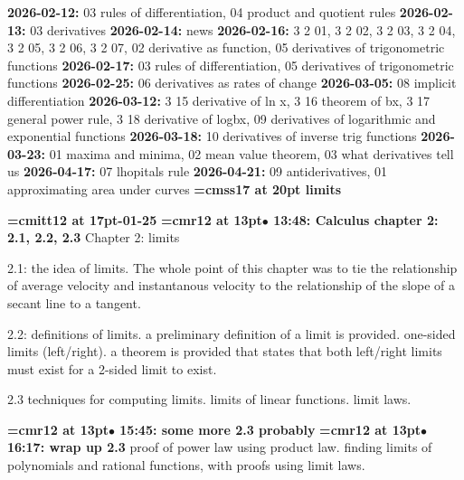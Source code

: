 {\noindent \bf 2026-02-12:} 03 rules of differentiation, 04 product and quotient rules\smallskip
{\noindent \bf 2026-02-13:} 03 derivatives\smallskip
{\noindent \bf 2026-02-14:} news\smallskip
{\noindent \bf 2026-02-16:} 3 2 01, 3 2 02, 3 2 03, 3 2 04, 3 2 05, 3 2 06, 3 2 07, 02 derivative as function, 05 derivatives of trigonometric functions\smallskip
{\noindent \bf 2026-02-17:} 03 rules of differentiation, 05 derivatives of trigonometric functions\smallskip
{\noindent \bf 2026-02-25:} 06 derivatives as rates of change\smallskip
{\noindent \bf 2026-03-05:} 08 implicit differentiation\smallskip
{\noindent \bf 2026-03-12:} 3 15 derivative of ln x, 3 16 theorem of bx, 3 17 general power rule, 3 18 derivative of logbx, 09 derivatives of logarithmic and exponential functions\smallskip
{\noindent \bf 2026-03-18:} 10 derivatives of inverse trig functions\smallskip
{\noindent \bf 2026-03-23:} 01 maxima and minima, 02 mean value theorem, 03 what derivatives tell us\smallskip
{\noindent \bf 2026-04-17:} 07 lhopitals rule\smallskip
{\noindent \bf 2026-04-21:} 09 antiderivatives, 01 approximating area under curves\smallskip
\vfill \break
{}
{\medskip\noindent\bf\font\titlefont=cmss17 at 20pt limits}\medskip

{\medskip\noindent\bf\font\titlefont=cmitt12 at 17pt-01-25}\medskip
{\smallskip\noindent\bf\font\titlefont=cmr12 at 13pt\titlefont $\bullet$ 13:48: Calculus chapter 2: 2.1, 2.2, 2.3}\smallskip
Chapter 2: limits
\par

2.1: the idea of limits. The whole point of this chapter was to tie the relationship of average velocity and instantanous velocity to the relationship of the slope of a secant line to a tangent.
\par

2.2: definitions of limits. a preliminary definition of a limit is provided. one-sided limits (left/right). a theorem is provided that states that both left/right limits must exist for a 2-sided limit to exist.
\par

2.3 techniques for computing limits. limits of linear functions. limit laws.
\par

{\smallskip\noindent\bf\font\titlefont=cmr12 at 13pt\titlefont $\bullet$ 15:45: some more 2.3 probably}\smallskip
{\smallskip\noindent\bf\font\titlefont=cmr12 at 13pt\titlefont $\bullet$ 16:17: wrap up 2.3}\smallskip
proof of power law using product law. finding limits of polynomials and rational functions, with proofs using limit laws.
\par

